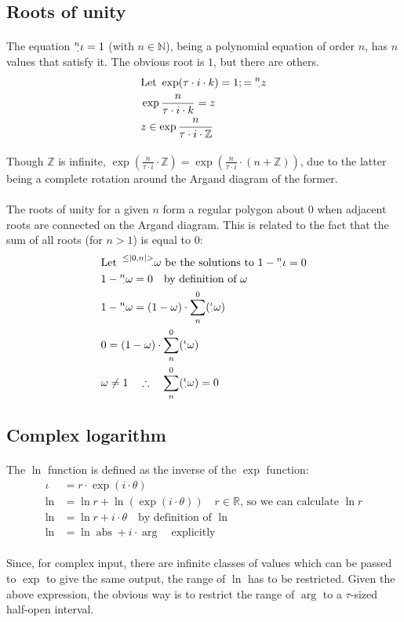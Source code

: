 \documentclass[11pt]{article}
\newcommand*\R{\ensuremath{\mathbb R}}
\newcommand*\id{\iota}
\newcommand*\cd{\cdot}
\newcommand*\prg{\paragraph}
\newcommand*\pt{\prescript}
\DeclareMathOperator{\abs}{abs}
\begin{document}
\subsection{Roots of unity}
\prg{}The equation $\pt n\cd\id=1$ (with $n\in\mathbb N$), being a polynomial equation of order $n$, has $n$ values that satisfy it. The obvious root is $1$, but there are others.
\[
\begin{aligned}
&\textrm{Let }\exp(\tau\cd i\cd k)=1;=\pt n\cd z \\
&\exp\frac{n}{\tau\cd i\cd k}=z \\
&z\in\exp\frac{n}{\tau\cd i\cd\mathbb Z} \\
\end{aligned}
\]
\prg{}Though $\mathbb Z$ is infinite, $\exp(\frac{n}{\tau\cd i}\cd\mathbb Z)=\exp(\frac{n}{\tau\cd i}\cd(n+\mathbb Z))$, due to the latter being a complete rotation around the Argand diagram of the former.

\prg{}The roots of unity for a given $n$ form a regular polygon about $0$ when adjacent roots are connected on the Argand diagram. This is related to the fact that the sum of all roots (for $n>1$) is equal to $0$:
\[
\begin{aligned}
&\textrm{Let }\pt{{\leq}|0,n|{>}}{\cd}\omega\textrm{ be the solutions to }1-\pt n\cd\id=0 \\
&1-\pt n\cd\omega=0 \quad\textrm{by definition of }\omega \\
&1-\pt n\cd\omega=(1-\omega)\cd\sum^0_n(\pt\id\cd\omega) \\
&0=(1-\omega)\cd\sum^0_n(\pt\id\cd\omega) \\
&\omega\neq 1\quad\therefore\quad\sum^0_n(\pt\id\cd\omega)=0
\end{aligned}
\]

\subsection{Complex logarithm}
\prg{}The $\ln$ function is defined as the inverse of the $\exp$ function:
\[
\begin{aligned}
\id&=r\cd\exp(i\cd\theta) \\
\ln&=\ln r+\ln(\exp(i\cd\theta)) \quad r\in\R\textrm{, so we can calculate }\ln r \\
\ln&=\ln r+i\cd\theta \quad\textrm{by definition of }\ln \\
\ln&=\ln\abs+i\cd\arg \quad\textrm{explicitly}
\end{aligned}
\]
\prg{}Since, for complex input, there are infinite classes of values which can be passed to $\exp$ to give the same output, the range of $\ln$ has to be restricted. Given the above expression, the obvious way is to restrict the range of $\arg$ to a $\tau$-sized half-open interval.
\end{document}
